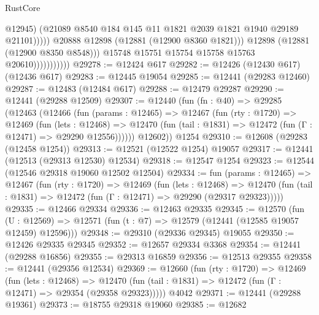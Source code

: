 \begin{lexlean}{RustCore}
\begin{coremodule}
                                        @12945)
                                      (@21089
                                        @8540
                                        @184
                                        @145
                                        @11
                                        @1821
                                        @2039
                                        @1821
                                        @1940
                                        @29189
                                        @21101)))))
                              @20888
                              @12898
                              (@12881 (@12900 @8360 @1821)))
                            @12898
                            (@12881 (@12900 @8350 @8548)))
                          @15748
                          @15751
                          @15754
                          @15758
                          @15763
                          @20610)))))))))))
@29278 := @12424 @617
@29282 := @12426 (@12430 @617) (@12436 @617)
@29283 := @12445 @19054
@29285 := @12441 (@29283 @12460)
@29287 := @12483 (@12484 @617)
@29288 := @12479 @29287
@29290 := @12441 (@29288 @12509)
@29307 := @12440
    (fun (fn : @40) =>
    @29285
      (@12463
        (@12466
          (fun (params : @12465) =>
          @12467
            (fun (rty : @1720) =>
            @12469
              (fun (lets : @12468) =>
              @12470 (fun (tail : @1831) => @12472 (fun (Γ : @12471) => @29290 @12556))))))
        @12602))
    @1254
@29310 := @12608 (@29283 (@12458 @1254))
@29313 := @12521 (@12522 @1254) @19057
@29317 := @12441 (@12513 (@29313 @12530) @12534)
@29318 := @12547 @1254
@29323 := @12544 (@12546 @29318 @19060 @12502 @12504)
@29334 := fun (params : @12465) =>
  @12467
    (fun (rty : @1720) =>
    @12469
      (fun (lets : @12468) =>
      @12470 (fun (tail : @1831) => @12472 (fun (Γ : @12471) => @29290 (@29317 @29323)))))
@29335 := @12466 @29334
@29336 := @12463 @29335
@29345 := @12570
    (fun (U : @12569) => @12571 (fun (t : @7) => @12579 (@12441 (@12585 @19057 @12459) @12596)))
@29348 := @29310 (@29336 @29345) @19055
@29350 := @12426 @29335 @29345
@29352 := @12657 @29334 @3368
@29354 := @12441 (@29288 @16856)
@29355 := @29313 @16859
@29356 := @12513 @29355
@29358 := @12441 (@29356 @12534)
@29369 := @12660
    (fun (rty : @1720) =>
    @12469
      (fun (lets : @12468) =>
      @12470 (fun (tail : @1831) => @12472 (fun (Γ : @12471) => @29354 (@29358 @29323)))))
    @4042
@29371 := @12441 (@29288 @19361)
@29373 := @18755 @29318 @19060
@29385 := @12682

\end{coremodule}
\end{lexlean}
